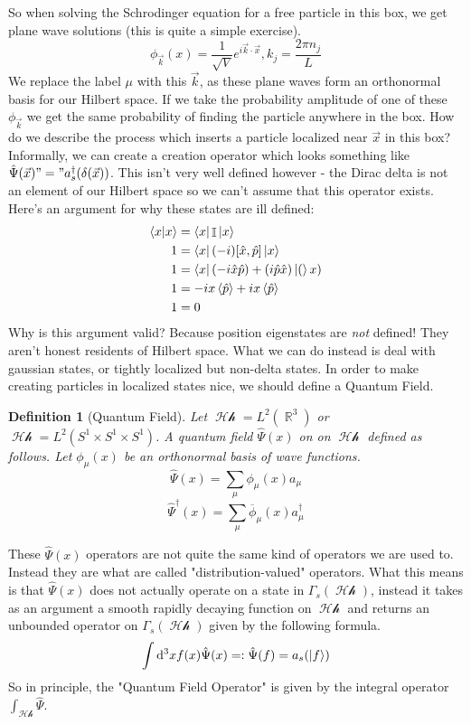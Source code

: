 \documentclass{article}
\DeclareMathOperator{\Hh}{\mathcal{Hh}}
\DeclareMathOperator{\RR}{\mathbb{R}}
\DeclareMathOperator{\II}{\mathbb{I}}
\newtheorem{defn}{Definition}
\begin{document}
So when solving the Schrodinger equation for a free particle in this box, we get plane wave solutions (this is quite a simple exercise).
\[\phi_{\vec{k}}(x) = \frac{1}{\sqrt{V}}e^{i\vec{k}\cdot\vec{x}},  k_j =\frac{2\pi n_j}{L} \]
We replace the label $\mu$ with this $\vec{k}$, as these plane waves form an orthonormal basis for our Hilbert space. If we take the probability amplitude of one of these $\phi_{\vec{k}}$ we get the same probability of finding the particle anywhere in the box. How do we describe the process which inserts a particle localized near $\vec{x}$ in this box? Informally, we can create a creation operator which looks something like $\hat\Psi(\vec{x}) "=" a_s^\dagger(\delta(\vec{x}))$. This isn't very well defined however - the Dirac delta is not an element of our Hilbert space so we can't assume that this operator exists. Here's an argument for why these states are ill defined:
\begin{align}
\bra{x}\ket{x}&= \bra{x}\II\ket{x}\\
1 &= \bra{x}(-i)[\hat x, \hat p]\ket{x}\\
1 &= \bra{x}(-i\hat x\hat p) + (i\hat p \hat x)\ket(x)\\
1 &= -ix\expval{\hat p} + ix\expval{\hat p} \\
1 &= 0
\end{align}
Why is this argument valid? Because position eigenstates are \textit{not} defined! They aren't honest residents of Hilbert space. What we can do instead is deal with gaussian states, or tightly localized but non-delta states. In order to make creating particles in localized states nice, we should define a Quantum Field.

\begin{defn}[Quantum Field]
Let $\Hh = L^2(\RR^3)$ or $\Hh = L^2(S^1\times S^1 \times S^1)$. A quantum field $\hat\Psi(x)$ on on $\Hh$ defined as follows. Let $\phi_\mu(x)$ be an orthonormal basis of wave functions.
\begin{equation}
\hat \Psi(x)= \sum_{\mu}\phi_\mu(x)a_\mu
\end{equation}
\begin{equation}
\hat \Psi^\dagger(x)= \sum_{\mu}\overline\phi_\mu(x)a^\dagger_\mu
\end{equation}
\end{defn}

These $\hat \Psi(x)$ operators are not quite the same kind of operators we are used to. Instead they are what are called "distribution-valued" operators. What this means is that $\hat\Psi(x)$ does not actually operate on a state in $\Gamma_s(\Hh)$, instead it takes as an argument a smooth rapidly decaying function on $\Hh$ and returns an unbounded operator on $\Gamma_s(\Hh)$ given by the following formula.
\begin{equation}
\int \dd^3 x f(x) \hat \Psi(x) =: \hat \Psi(f) = a_s(\ket{f})
\end{equation}
So in principle, the "Quantum Field Operator" is given by the integral operator $\int_{\Hh }\hat\Psi$.
\end{document}
